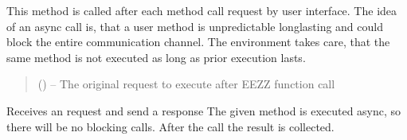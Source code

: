 \documentclass[letterpaper,10pt,english]{sphinxmanual}
\begin{document}
\begin{savenotes}
\begin{fulllineitems}
\begin{savenotes}
\begin{fulllineitems}
\begin{quote}
\begin{description}
\end{description}\end{quote}

\end{fulllineitems}\end{savenotes}


\begin{savenotes}\begin{fulllineitems}
\label{\detokenize{eezz:eezz.websocket.TWebSocketClient.handle_aync_request}}
\pysigstartsignatures
{}
\pysigstopsignatures
\sphinxAtStartPar
This method is called after each method call request by user interface. The idea of an async call is,
that a user method is unpredictable long\sphinxhyphen{}lasting and could block the entire communication channel.
The environment takes care, that the same method is not executed as long as prior execution lasts.
\begin{quote}\begin{description}
\sphinxAtStartPar
{} () – The original request to execute after EEZZ function call

\end{description}\end{quote}

\end{fulllineitems}\end{savenotes}


\begin{savenotes}\begin{fulllineitems}
\label{\detokenize{eezz:eezz.websocket.TWebSocketClient.handle_request}}
\pysigstartsignatures
{}
\pysigstopsignatures
\sphinxAtStartPar
Receives an request and send a response
The given method is executed async, so there will be no blocking calls. After the call the result
is collected.


\end{fulllineitems}
\end{savenotes}
\end{fulllineitems}
\end{savenotes}
\end{document}
